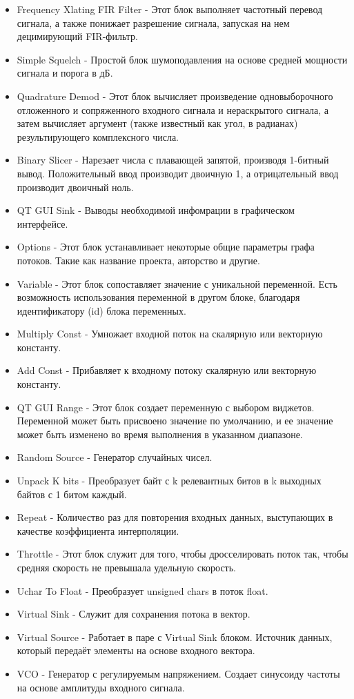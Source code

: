 \begin{itemize}
	\item Frequency Xlating FIR Filter - Этот блок выполняет частотный перевод сигнала, а также понижает разрешение сигнала, запуская на нем децимирующий FIR-фильтр.
	\item Simple Squelch - Простой блок шумоподавления на основе средней мощности сигнала и порога в дБ.
	\item Quadrature Demod - Этот блок вычисляет произведение одновыборочного отложенного и сопряженного входного сигнала и нераскрытого сигнала, а затем вычисляет аргумент (также известный как угол, в радианах) результирующего комплексного числа.
	\item Binary Slicer - Нарезает числа с плавающей запятой, производя 1-битный вывод. Положительный ввод производит двоичную 1, а отрицательный ввод производит двоичный ноль. 
	\item QT GUI Sink - Выводы необходимой инфомрации в графическом интерфейсе.
    \item Options - Этот блок устанавливает некоторые общие параметры графа потоков. Такие как название проекта, авторство и другие. 
	\item Variable - Этот блок сопоставляет значение с уникальной переменной. Есть возможность использования переменной в другом блоке, благодаря идентификатору (id) блока переменных. 
	\item Multiply Const - Умножает входной поток на скалярную или векторную константу.
	\item Add Const - Прибавляет к входному потоку скалярную или векторную константу.
	\item QT GUI Range - Этот блок создает переменную с выбором виджетов. Переменной может быть присвоено значение по умолчанию, и ее значение может быть изменено во время выполнения в указанном диапазоне.
	\item Random Source - Генератор случайных чисел.
	\item Unpack K bits - Преобразует байт с k релевантных битов в k выходных байтов с 1 битом каждый.
	\item Repeat - Количество раз для повторения входных данных, выступающих в качестве коэффициента интерполяции.
	\item Throttle - Этот блок служит для того, чтобы дросселировать поток так, чтобы средняя скорость не превышала удельную скорость.
	\item Uchar To Float - Преобразует unsigned chars в поток float.
	\item Virtual Sink - Служит для сохранения потока в вектор.
	\item Virtual Source - Работает в паре с Virtual Sink блоком. Источник данных, который передаёт элементы на основе входного вектора. 
	\item VCO - Генератор с регулируемым напряжением. Создает синусоиду частоты на основе амплитуды входного сигнала.
\end{itemize}

